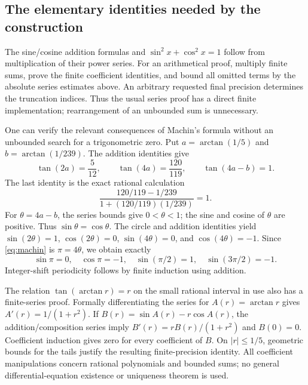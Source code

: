 \subsection{The elementary identities needed by the construction}

The sine/cosine addition formulas and
$\sin^2x+\cos^2x=1$ follow from multiplication of their power series.
For an arithmetical proof, multiply finite sums, prove the finite
coefficient identities, and bound all omitted terms by the absolute
series estimates above. An arbitrary requested final precision determines
the truncation indices. Thus the usual series proof has a direct finite
implementation; rearrangement of an unbounded sum is unnecessary.

One can verify the relevant consequences of Machin's formula without an
unbounded search for a trigonometric zero. Put
$a=\arctan(1/5)$ and $b=\arctan(1/239)$. The addition identities give
\[
 \tan(2a)=\frac5{12},\qquad
 \tan(4a)=\frac{120}{119},\qquad
 \tan(4a-b)=1.
\]
The last identity is the exact rational calculation
\[
 \frac{120/119-1/239}{1+(120/119)(1/239)}=1.
\]
For $\theta=4a-b$, the series bounds give $0<\theta<1$;
the sine and cosine of $\theta$ are positive. Thus
$\sin\theta=\cos\theta$. The circle and addition identities yield
$\sin(2\theta)=1$, $\cos(2\theta)=0$,
$\sin(4\theta)=0$, and $\cos(4\theta)=-1$.
Since \eqref{eq:machin} is $\pi=4\theta$, we obtain exactly
\[
 \sin\pi=0,\quad\cos\pi=-1,\quad
 \sin(\pi/2)=1,\quad\sin(3\pi/2)=-1.
\]
Integer-shift periodicity follows by finite induction using addition.

The relation $\tan(\arctan r)=r$ on the small rational interval in use
also has a finite-series proof. Formally differentiating the series for
$A(r)=\arctan r$ gives $A'(r)=1/(1+r^2)$. If
$B(r)=\sin A(r)-r\cos A(r)$, the addition/composition series imply
$B'(r)=rB(r)/(1+r^2)$ and $B(0)=0$. Coefficient induction gives zero
for every coefficient of $B$. On $|r|\le1/5$, geometric bounds for
the tails justify the resulting finite-precision identity. All
coefficient manipulations concern rational polynomials and bounded sums;
no general differential-equation existence or uniqueness theorem is used.

